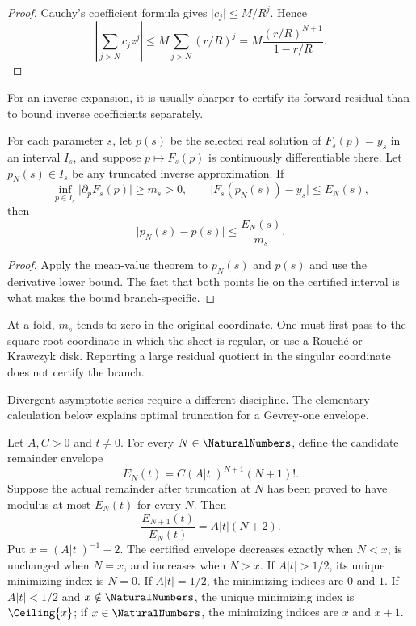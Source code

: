 \begin{proof}
Cauchy's coefficient formula gives \(\lvert c_j\rvert\le M/R^j\).  Hence
\[
 \left\lvert\sum_{j>N}c_jz^j\right\rvert
 \le M\sum_{j>N}(r/R)^j
 =M\frac{(r/R)^{N+1}}{1-r/R}.
\]
\end{proof}

For an inverse expansion, it is usually sharper to certify its forward
residual than to bound inverse coefficients separately.

\begin{theorem}
\label{thm:inverse-residual-transfer}
For each parameter \(s\), let \(p(s)\) be the selected real solution of
\(F_s(p)=y_s\) in an interval \(I_s\), and suppose
\(p\mapsto F_s(p)\) is continuously differentiable there.  Let
\(p_N(s)\in I_s\) be any truncated inverse approximation.  If
\[
 \inf_{p\in I_s}\lvert\partial_pF_s(p)\rvert\ge m_s>0,
 \qquad
 \lvert F_s(p_N(s))-y_s\rvert\le E_N(s),
\]
then
\[
 \lvert p_N(s)-p(s)\rvert\le\frac{E_N(s)}{m_s}.
\]
\end{theorem}

\begin{proof}
Apply the mean-value theorem to \(p_N(s)\) and \(p(s)\) and use the derivative
lower bound.  The fact that both points lie on the certified interval is what
makes the bound branch-specific.
\end{proof}

At a fold, \(m_s\) tends to zero in the original coordinate.  One must first
pass to the square-root coordinate in which the sheet is regular, or use a
Rouch\'e or Krawczyk disk.  Reporting a large residual quotient in the singular
coordinate does not certify the branch.

Divergent asymptotic series require a different discipline.  The elementary
calculation below explains optimal truncation for a Gevrey-one envelope.

\begin{proposition}
\label{prop:gevrey-least-term}
Let \(A,C>0\) and \(t\ne0\).  For every \(N\in\NaturalNumbers\), define the candidate
remainder envelope
\[
 E_N(t)=C(A\lvert t\rvert)^{N+1}(N+1)!.
\]
Suppose the actual remainder after truncation at \(N\) has been proved to
have modulus at most \(E_N(t)\) for every \(N\).  Then
\[
 \frac{E_{N+1}(t)}{E_N(t)}=A\lvert t\rvert(N+2).
\]
Put \(x=(A\lvert t\rvert)^{-1}-2\).  The certified envelope decreases
exactly when \(N<x\), is unchanged when \(N=x\), and increases when \(N>x\).
If \(A\lvert t\rvert>1/2\), its unique minimizing index is \(N=0\).  If
\(A\lvert t\rvert=1/2\), the minimizing indices are \(0\) and \(1\).  If
\(A\lvert t\rvert<1/2\) and \(x\notin\NaturalNumbers\), the unique minimizing index is
\(\Ceiling{x}\); if \(x\in\NaturalNumbers\), the minimizing indices are \(x\) and
\(x+1\).
\end{proposition}

